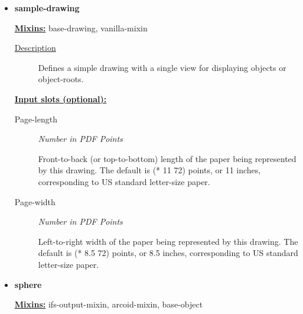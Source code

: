 \documentclass [11pt]{book}
\begin{document}
\begin{itemize}
\begin{description}
\end{description}







\item {}
\label{prim:sample-drawing}
\textbf{sample-drawing}


\textbf{
\underline{Mixins:}} base-drawing, vanilla-mixin





\begin{description}

\item [
\underline{Description}]


Defines a simple drawing with a single view for displaying objects or object-roots.



\end{description}








\textbf{
\underline{Input slots (optional):}}

\begin{description}

\item [Page-length]
\emph{Number in PDF Points}

 Front-to-back (or top-to-bottom) length of the paper being represented
by this drawing. The default is (* 11 72) points, or 11 inches, corresponding to US standard
letter-size paper.




\item [Page-width]
\emph{Number in PDF Points}

 Left-to-right width of the paper being represented by this drawing.
The default is (* 8.5 72) points, or 8.5 inches, corresponding to US standard letter-size paper.




\end{description}







\item {}
\label{prim:sphere}
\textbf{sphere}


\textbf{
\underline{Mixins:}} ifs-output-mixin, arcoid-mixin, base-object






\end{itemize}
\end{document}
